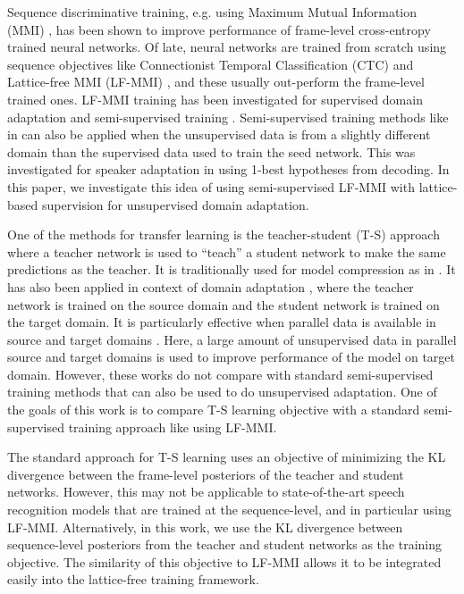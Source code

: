 \documentclass{article}
\begin{document}
Sequence discriminative training, e.g. using Maximum Mutual Information (MMI)
\cite{bahl-mmie},
has been shown to improve performance of frame-level cross-entropy trained
neural networks. Of late, neural networks are trained from scratch
using sequence objectives like Connectionist Temporal Classification (CTC)
\cite{graves2006ctc} and Lattice-free MMI (LF-MMI)
\cite{chain}, and these usually out-perform the frame-level trained ones.
LF-MMI training has been investigated for supervised domain adaptation
\cite{pegah2017transfer} and semi-supervised training \cite{manohar2018semisup}.
Semi-supervised training methods like in \cite{manohar2018semisup} can also
be applied when the unsupervised data is from a slightly different domain than
the supervised data used to train the seed network. 
This was investigated for
speaker adaptation in \cite{kanda2017sequence-kl} using 1-best hypotheses 
from decoding.
% 
% 
In this paper, we investigate this idea of using semi-supervised LF-MMI with
lattice-based supervision for unsupervised domain adaptation.

One of the methods for transfer learning is the teacher-student (T-S) approach
where a teacher network is used to ``teach'' a student network to make the 
same predictions as the teacher. It is traditionally used for model compression
\cite{bucilua2006model} as in \cite{ba2014deep,hinton2015distilling}. It has also
been applied in context of domain adaptation \cite{yu2013kl}, where the teacher
network is trained on the source domain and the student network is trained on
the target domain. It is particularly effective when parallel data is available
in source and target domains \cite{li-2017-teacher-student}. Here, a large 
amount of unsupervised data in parallel source and target domains is used to 
improve performance of the model on target domain. However, these works do 
not compare with standard semi-supervised training methods that can also be used
to do unsupervised adaptation. One of the goals of this work is to 
compare T-S learning objective with a standard semi-supervised training
approach like using LF-MMI.

The standard approach for T-S learning uses an objective of minimizing 
the KL divergence between the frame-level posteriors of the teacher and student
networks. However, this may not be applicable to state-of-the-art 
speech recognition models that are trained at the sequence-level, and in
particular using LF-MMI. Alternatively, in this work, we use the 
KL divergence between sequence-level posteriors
\cite{wong2016sequence-ts,kanda2017sequence-kl} 
from the teacher and student networks as the training objective. The similarity
of this objective to LF-MMI allows it to be integrated easily into the
lattice-free training framework.
\end{document}
